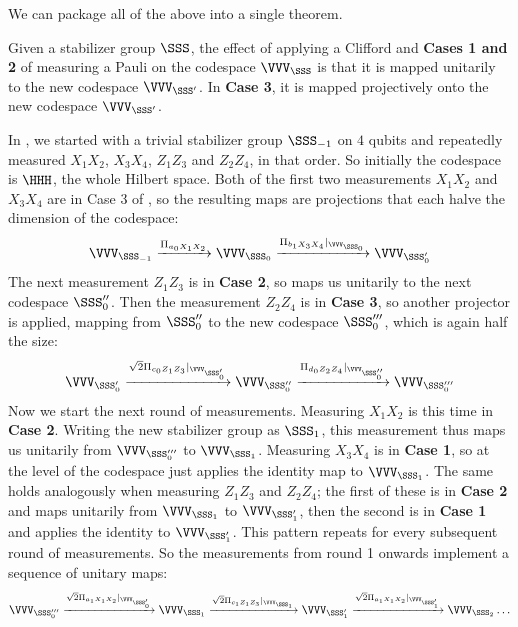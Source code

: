 We can package all of the above into a single theorem.

\begin{theorem}\label{thm:codespace_maps}
    Given a stabilizer group $\SSS$, the effect of applying a Clifford and \textbf{Cases 1 and 2} of measuring a Pauli on the codespace $\VVV_\SSS$ is that it is mapped unitarily to the new codespace $\VVV_{\SSS'}$.
    In \textbf{Case 3}, it is mapped projectively onto the new codespace $\VVV_{\SSS'}$.
\end{theorem}

\begin{example}\label{ex:bacon_shor_codespace_updates}
    In , we started with a trivial stabilizer group $\SSS_{-1}$ on $4$ qubits and repeatedly measured $X_1 X_2$, $X_3 X_4$, $Z_1 Z_3$ and $Z_2 Z_4$, in that order.
    So initially the codespace is $\HHH$, the whole Hilbert space.
    Both of the first two measurements $X_1 X_2$ and $X_3 X_4$ are in Case 3 of , so the resulting maps are projections that each halve the dimension of the codespace:
    \begin{equation}
        \VVV_{\SSS_{-1}}
        \xrightarrow{\Pi_{a_0 X_1 X_2}}
        \VVV_{\SSS_0}
        \xrightarrow{\Pi_{b_1 X_3 X_4}|_{\VVV_{\SSS_{0}}}}
        \VVV_{\SSS_0'}
    \end{equation}
    The next measurement $Z_1 Z_3$ is in \textbf{Case 2}, so maps us unitarily to the next codespace $\SSS_0''$.
    Then the measurement $Z_2 Z_4$ is in \textbf{Case 3}, so another projector is applied, mapping from $\SSS_0''$ to the new codespace $\SSS_0'''$, which is again half the size:
    \begin{equation}
        \VVV_{\SSS_{0}'}
        \xrightarrow{\sqrt{2}\Pi_{c_0 Z_1 Z_3}|_{\VVV_{\SSS_{0}'}}}
        \VVV_{\SSS_0''}
        \xrightarrow{\Pi_{d_0 Z_2 Z_4}|_{\VVV_{\SSS_{0}''}}}
        \VVV_{\SSS_0'''}
    \end{equation}
    Now we start the next round of measurements.
    Measuring $X_1 X_2$ is this time in \textbf{Case 2}.
    Writing the new stabilizer group as $\SSS_1$, this measurement thus maps us unitarily from $\VVV_{\SSS_0'''}$ to $\VVV_{\SSS_1}$.
    Measuring $X_3 X_4$ is in \textbf{Case 1}, so at the level of the codespace just applies the identity map to $\VVV_{\SSS_1}$.
    The same holds analogously when measuring $Z_1 Z_3$ and $Z_2 Z_4$; the first of these is in \textbf{Case 2} and maps unitarily from $\VVV_{\SSS_1}$ to $\VVV_{\SSS_1'}$, then the second is in \textbf{Case 1} and applies the identity to $\VVV_{\SSS_1'}$.
    This pattern repeats for every subsequent round of measurements.
    So the measurements from round 1 onwards implement a sequence of unitary maps:
    \begin{equation}
        \VVV_{\SSS_0'''}
        \xrightarrow{\sqrt{2}\Pi_{a_1 X_1 X_2}|_{\VVV_{\SSS_0'}}}
        \VVV_{\SSS_1}
        \xrightarrow{\sqrt{2}\Pi_{c_1 Z_1 Z_3}|_{\VVV_{\SSS_1}}}
        \VVV_{\SSS_1'}
        \xrightarrow{\sqrt{2}\Pi_{a_1 X_1 X_2}|_{\VVV_{\SSS_1'}}}
        \VVV_{\SSS_2}
        \ldots
    \end{equation}
\end{example}

